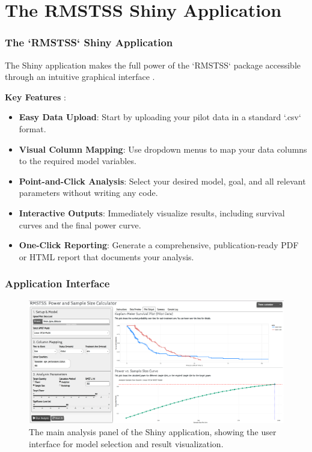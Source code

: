 \documentclass{beamer}
\begin{document}
\section{The RMSTSS Shiny Application}

\begin{frame}
\frametitle{The `RMSTSS` Shiny Application}
The Shiny application makes the full power of the `RMSTSS` package accessible through an intuitive graphical interface \cite{[1]}.

\textbf{Key Features} \cite{[1]}:
\begin{itemize}
    \item \textbf{Easy Data Upload}: Start by uploading your pilot data in a standard `.csv` format.
    \item \textbf{Visual Column Mapping}: Use dropdown menus to map your data columns to the required model variables.
    \item \textbf{Point-and-Click Analysis}: Select your desired model, goal, and all relevant parameters without writing any code.
    \item \textbf{Interactive Outputs}: Immediately visualize results, including survival curves and the final power curve.
    \item \textbf{One-Click Reporting}: Generate a comprehensive, publication-ready PDF or HTML report that documents your analysis.
\end{itemize}
\end{frame}

\begin{frame}
\frametitle{Application Interface}
\begin{figure}
\includegraphics[width=\textwidth]{images/app-ss.png}
\caption{The main analysis panel of the Shiny application, showing the user interface for model selection and result visualization.}
\end{figure}
\end{frame}
\end{document}
